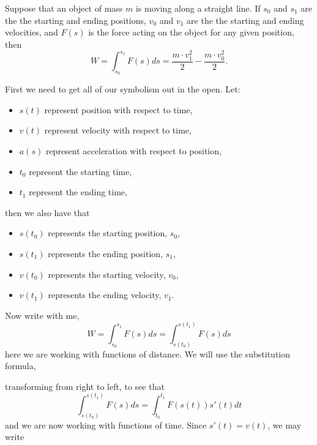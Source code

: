 \documentclass{ximera}
\begin{document}
\begin{theorem}
  Suppose that an object of mass $m$ is moving along a straight
  line. If $s_0$ and $s_1$ are the the starting and ending positions,
  $v_0$ and $v_1$ are the the starting and ending velocities, and
  $F(s)$ is the force acting on the object for any given position,
  then
  \[
  W = \int_{s_0}^{s_1} F(s) ds = \frac{m\cdot v_1^2}{2} - \frac{m\cdot v_0^2}{2}.
  \]
  \begin{explanation}
    First we need to get all of our symbolism out in the open. Let:
    \begin{itemize}
    \item $s(t)$ represent position with respect to time,
    \item $v(t)$ represent velocity with respect to time,
    \item $a(s)$ represent acceleration with respect to position,
    \item $t_0$ represent the starting time,
    \item $t_1$ represent the ending time,
    \end{itemize}
    then we also have that
    \begin{itemize}
    \item $s(t_0)$ represents the starting position, $s_0$,
    \item $s(t_1)$ represents the ending position, $s_1$,
    \item $v(t_0)$ represents the starting velocity, $v_0$,
    \item $v(t_1)$ represents the ending velocity, $v_1$.
    \end{itemize}
    Now write with me,
    \[
    W = \int_{s_0}^{s_1} F(s) ds = \int_{s(t_0)}^{s(t_1)} F(s) ds
    \]
    here we are working with functions of distance. We will use the
    substitution formula,
    \begin{image}
  \end{image} 
    transforming from right to left, to see that
    \[
    \int_{s(t_0)}^{s(t_1)} F(s) ds = \int_{t_0}^{t_1} F(s(t)) s'(t) dt
    \]
    and we are now working with functions of time. Since $s'(t) =
    v(t)$, we may write
    \[
\]
\end{explanation}
\end{theorem}
\end{document}
